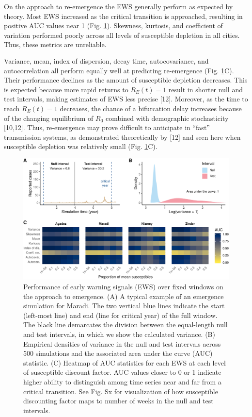 \documentclass[3p]{elsarticle} %
\makeatletter
\def\maxwidth{\ifdim\Gin@nat@width>\linewidth\linewidth
\else\Gin@nat@width\fi}
\let\Oldincludegraphics\includegraphics
\renewcommand{\includegraphics}[1]{\Oldincludegraphics[width=\maxwidth]{#1}}
\makeatother
\begin{document}
On the approach to re-emergence the EWS generally perform as expected by
theory. Most EWS increased as the critical transition is approached,
resulting in positive AUC values near 1 (Fig. \ref{emerge-aucs}).
Skewness, kurtosis, and coefficient of variation performed poorly across
all levels of susceptible depletion in all cities. Thus, these metrics
are unreliable.

Variance, mean, index of dispersion, decay time, autocovariance, and
autocorrelation all perform equally well at predicting re-emergence
(Fig. \ref{emerge-aucs}C). Their performance declines as the amount of
susceptible depletion decreases. This is expected because more rapid
returns to \(R_E(t)=1\) result in shorter null and test intervals,
making estimates of EWS less precise {[}12{]}. Moreover, as the time to
reach \(R_E(t)=1\) decreases, the chance of a bifurcation delay
increases because of the changing equilibrium of \(R_0\) combined with
demographic stochasticity {[}10,12{]}. Thus, re-emergence may prove
difficult to anticipate in ``fast'' transmission systems, as
demonstrated theoretically by {[}12{]} and seen here when susceptible
depletion was relatively small (Fig. \ref{emerge-aucs}C).

\begin{figure}
\centering
\includegraphics{measles-ews-manuscript_files/figure-latex/emergence-results-1.pdf}
\caption{Performance of early warning signals (EWS) over fixed windows
on the approach to emergence. (A) A typical example of an emergence
simulation for Maradi. The two vertical blue lines indicate the start
(left-most line) and end (line for critical year) of the full window.
The black line demarcates the division between the equal-length null and
test intervals, in which we show the calculated variance. (B) Empirical
densities of variance in the null and test intervals across 500
simulations and the associated area under the curve (AUC) statistic. (C)
Heatmap of AUC statistics for each EWS at each level of susceptible
discount factor. AUC values closer to 0 or 1 indicate higher ability to
distinguish among time series near and far from a critical transition.
See Fig. Sx for visualization of how susceptible discounting factor maps
to number of weeks in the null and test intervals. \label{emerge-aucs}}
\end{figure}
\end{document}
